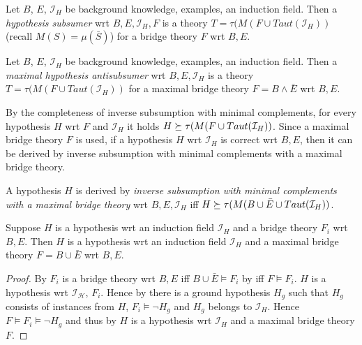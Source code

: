 \begin{defn}
Let $B$, $E$, $\mathcal{I}_H$ be background knowledge, examples, an induction field. Then a \emph{hypothesis subsumer} wrt $B, E, \mathcal{I}_H, F$ is a theory
$T=\tau(M(F \cup Taut(\mathcal{I}_H))$ (recall $M(S)=\mu(\bar{S})$) for a bridge theory $F$ wrt $B, E$.
\end{defn}

\begin{defn}
Let $B$, $E$, $\mathcal{I}_H$ be background knowledge, examples, an induction field. Then a \emph{maximal hypothesis antisubsumer} wrt $B, E, \mathcal{I}_H$ is a theory
$T=\tau(M(F \cup Taut(\mathcal{I}_H))$ for a maximal bridge theory $F=B \land \bar{E}$ wrt $B, E$.
\end{defn}

By the completeness of inverse subsumption with minimal complements, for every hypothesis $H$ wrt $F$ and $\mathcal{I}_H$ it holds $H \succeq \tau(M(F \cup Taut(\mathcal{I}_H))$. Since a maximal bridge theory $F$ is used, if a hypothesis $H$ wrt $\mathcal{I}_H$ is correct wrt $B, E$, then it can be derived by inverse subsumption with minimal complements with a maximal bridge theory.

\begin{defn}
A hypothesis $H$ is derived by \emph{inverse subsumption with minimal complements with a maximal bridge theory} wrt $B, E, \mathcal{I}_H$ iff
$H \succeq \tau(M(B \cup \bar{E} \cup Taut(\mathcal{I}_H))$.
\end{defn}

\begin{lemma}\label{lemma_hypothesis_wrt_bridge_theory_correspondence}
Suppose $H$ is a hypothesis wrt an induction field $\mathcal{I}_H$ and a bridge theory $F_i$ wrt $B, E$. Then $H$ is a hypothesis wrt an induction field $\mathcal{I}_H$ and a maximal bridge theory $F=B \cup \bar{E}$ wrt $B, E$.
\end{lemma}
\begin{proof}
By  $F_i$ is a bridge theory wrt $B, E$ iff $B \cup \bar{E} \models F_i$ by  iff $F \models F_i$.
$H$ is a hypothesis wrt $\mathcal{I_H}$, $F_i$. Hence by  there is a ground hypothesis $H_g$ such that $H_g$ consists of instances from $H$,
$F_i \models \neg H_g$ and $H_g$ belongs to $\mathcal{I}_H$. Hence $F \models F_i \models \neg H_g$ and thus by  $H$ is a hypothesis wrt $\mathcal{I}_H$ and a maximal bridge theory $F$.
\end{proof}

